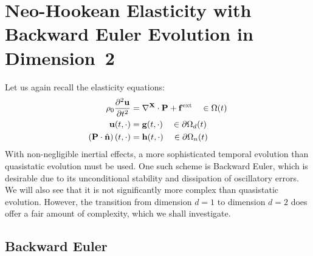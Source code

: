 \section{Neo-Hookean Elasticity with Backward Euler Evolution in Dimension~2}

Let us again recall the elasticity equations:
\begin{subequations}\label{eq:elasticity.ii}
\begin{align}
\rho_0 \frac{\partial^2 \mathbf{u}}{\partial t^2} & = \nabla^{\mathbf{X}} \cdot \mathbf{P} + \mathbf{f}^{\text{ext}} \quad \in \Omega(t) \\
\mathbf{u}(t,\cdot) & = \mathbf{g}(t,\cdot) \quad \in \partial \Omega_d(t) \\
\left( \mathbf{P} \cdot \hat{\mathbf{n}} \right) (t,\cdot) & = \mathbf{h}(t,\cdot) \quad \in \partial \Omega_n(t)
\end{align}
\end{subequations}
With non-negligible inertial effects, a more sophisticated temporal evolution than quasistatic evolution must be used. One such scheme is Backward Euler, which is desirable due to its unconditional stability and dissipation of oscillatory errors. We will also see that it is not significantly more complex than quasistatic evolution. However, the transition from dimension $d = 1$ to dimension $d = 2$ does offer a fair amount of complexity, which we shall investigate.

\subsection{Backward Euler}

